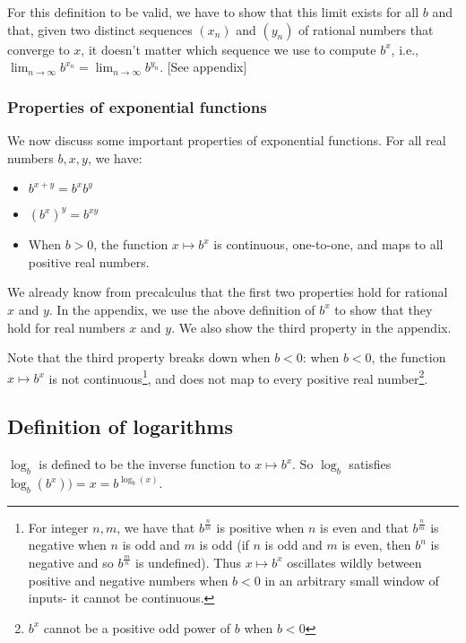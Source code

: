 \documentclass{article}
\begin{document}
For this definition to be valid, we have to show that this limit exists for all $b$ and that, given two distinct sequences $(x_n)$ and $(y_n)$ of rational numbers that converge to $x$, it doesn't matter which sequence we use to compute $b^x$, i.e., $\lim_{n \rightarrow \infty} b^{x_n} = \lim_{n \rightarrow \infty} b^{y_n}$. [See appendix]

\subsubsection*{Properties of exponential functions}

We now discuss some important properties of exponential functions. For all real numbers $b, x, y$, we have:

\begin{itemize}
    \item $b^{x + y} = b^x b^y$
    \item $(b^x)^y = b^{xy}$
    \item When $b > 0$, the function $x \mapsto b^x$ is continuous, one-to-one, and maps to all positive real numbers.
\end{itemize}

We already know from precalculus that the first two properties hold for rational $x$ and $y$. In the appendix, we use the above definition of $b^x$ to show that they hold for real numbers $x$ and $y$. We also show the third property in the appendix.

Note that the third property breaks down when $b < 0$: when $b < 0$, the function $x \mapsto b^x$ is not continuous\footnote{For integer $n, m$, we have that $b^{\frac{n}{m}}$ is positive when $n$ is even and that $b^{\frac{n}{m}}$ is negative when $n$ is odd and $m$ is odd (if $n$ is odd and $m$ is even, then $b^n$ is negative and so $b^{\frac{m}{n}}$ is undefined). Thus $x \mapsto b^x$ oscillates wildly between positive and negative numbers when $b < 0$ in an arbitrary small window of inputs- it cannot be continuous.}, and does not map to every positive real number\footnote{$b^x$ cannot be a positive odd power of $b$ when $b < 0$}.

\subsection*{Definition of logarithms}

$\log_b$ is defined to be the inverse function to $x \mapsto b^x$. So $\log_b$ satisfies $\log_b(b^x)) = x = b^{\log_b(x)}$.
\end{document}
